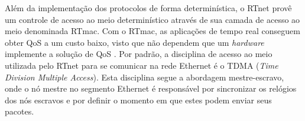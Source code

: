 	Além da implementação dos protocolos de forma determinística, o RTnet provê um controle de acesso ao meio determinístico através de sua camada de acesso ao meio denominada RTmac. Com o RTmac, as aplicações de tempo real conseguem obter QoS a um custo baixo, visto que não dependem que um \textit{hardware} implemente a solução de QoS \cite{KWZB05}. Por padrão, a disciplina de acesso ao meio utilizada pelo RTnet para se comunicar na rede Ethernet é o TDMA (\textit{Time Division Multiple Access}). Esta disciplina segue a abordagem mestre-escravo, onde o nó mestre no segmento Ethernet é responsável por sincronizar os relógios dos nós escravos e por definir o momento em que estes podem enviar seus pacotes.